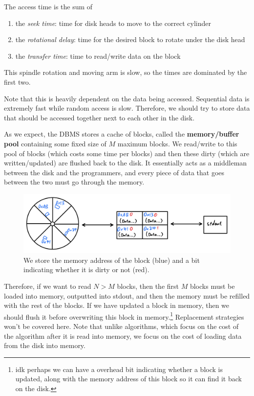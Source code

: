 \documentclass{article}
\begin{document}
    \begin{definition}
      The access time is the sum of 
      \begin{enumerate}
        \item the \textit{seek time}: time for disk heads to move to the correct cylinder 
        \item the \textit{rotational delay}: time for the desired block to rotate under the disk head 
        \item the \textit{transfer time}: time to read/write data on the block
      \end{enumerate}
      This spindle rotation and moving arm is slow, so the times are dominated by the first two. 
    \end{definition}

    Note that this is heavily dependent on the data being accessed. Sequential data is extremely fast while random access is slow. Therefore, we should try to store data that should be accessed together next to each other in the disk.  

    \begin{definition}
      As we expect, the DBMS stores a cache of blocks, called the \textbf{memory/buffer pool} containing some fixed size of $M$ maximum blocks. We read/write to this pool of blocks (which costs some time per blocks) and then these dirty (which are written/updated) are flushed back to the disk. It essentially acts as a middleman between the disk and the programmers, and every piece of data that goes between the two must go through the memory. 

      \begin{figure}[H]
        \centering 
        \includegraphics[scale=0.4]{img/disk_memory.png}
        \caption{We store the memory address of the block (blue) and a bit indicating whether it is dirty or not (red). } 
        \label{fig:disk_memory}
      \end{figure}
    \end{definition}

    Therefore, if we want to read $N > M$ blocks, then the first $M$ blocks must be loaded into memory, outputted into stdout, and then the memory must be refilled with the rest of the blocks. If we have updated a block in memory, then we should flush it before overwriting this block in memory.\footnote{idk perhaps we can have a overhead bit indicating whether a block is updated, along with the memory address of this block so it can find it back on the disk.} Replacement strategies won't be covered here. Note that unlike algorithms, which focus on the cost of the algorithm after it is read into memory, we focus on the cost of loading data from the disk into memory. 
\end{document}
